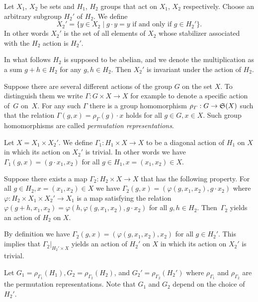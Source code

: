 \documentclass[pdftex]{sigma}
\begin{document}
Let $X_1$, $X_2$ be sets and $H_1$, $H_2$ groups that act on $X_1$, $X_2$ respectively.
Choose an arbitrary subgroup $H_2'$ of $H_2$.
We def\/ine
\begin{equation}\label{eq:apr21_1}
X_2' = \{ y \in X_2 \mid g \cdot y = y \mbox{ if and only if } g \in H_2' \}.
\end{equation}
In other words $X_2'$ is the set of all elements of $X_2$ whose stabilizer
associated with the $H_2$ action is $H_2'$.


In what follows $H_2$ is supposed to be abelian, and we denote the multiplication as a sum $g+h \in H_2$
for any $g, h \in H_2$.
Then $X_2'$ is invariant under the action of $H_2$.

\begin{remark}\label{rem:apr21_2}
Suppose there are several dif\/ferent actions of the group $G$ on the set $X$.
To distinguish them we write
$\varGamma : G \times X \rightarrow X$ for example to denote
a specif\/ic action of~$G$ on~$X$.
For any such $\varGamma$
there is a
group homomorphism $\rho_{\varGamma} : G \rightarrow {\frak S}(X)$ such that
the relation $\varGamma (g,x) = \rho_{\varGamma} (g) \cdot x$ holds
for all $g \in G, x \in X$.
Such group homomorphisms are called {\em permutation representations}.
\end{remark}

Let $X = X_1 \times X_2'$.
We def\/ine $\varGamma_1 : H_1 \times X \rightarrow X$
to be a diagonal action of
$H_1$ on $X$
in which its action on $X_2'$ is trivial.
In other words we have
$\varGamma_1(g, x) = (g \cdot x_1, x_2)$ for all $g \in H_1, x =(x_1,x_2) \in X$.

Suppose there exists a map $\varGamma_2 : H_2 \times X \rightarrow X$
that has the following property.
For all $g \in H_2, x =(x_1,x_2) \in X$ we have
$\varGamma_2(g, x) = (\varphi (g, x_1,x_2), g \cdot x_2)$ where
$\varphi : H_2 \times X_1 \times X_2' \rightarrow X_1$ is a map
satisfying the relation $\varphi (g + h, x_1,x_2) = \varphi (h , \varphi (g, x_1,x_2),g \cdot x_2)$ for all $g,h \in H_2$.
Then~$\varGamma_2$ yields an action of $H_2$ on $X$.

By def\/inition we have
$\varGamma_2(g, x) = (\varphi (g, x_1,x_2), x_2)$ for all $g \in H_2'$.
This implies that $\varGamma_2 |_{H_2' \times X}$ yields an action of $H_2'$ on $X$ in which its action on $X_2'$ is trivial.

Let $G_1 = \rho_{\varGamma_1} (H_1), G_2 = \rho_{\varGamma_2} (H_2)$, and $G_2' = \rho_{\varGamma_2} (H_2')$
where $\rho_{\varGamma_1}$ and $\rho_{\varGamma_2}$ are the permutation representations.
Note that $G_1$ and $G_2$
depend on the choice of $H_2'$.
\end{document}
